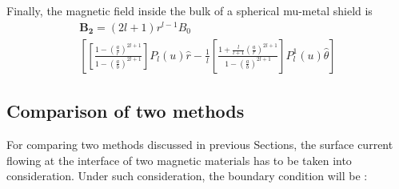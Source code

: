 


Finally, the magnetic field inside the bulk of a spherical mu-metal shield is
\begin{multline}\label{B}
\bm{B_2}=(2l+1)r^{l-1} B_0  \\
\left[ \left[\frac{1-\left(\frac{a}{r}\right)^{2l+1}}{1-\left(\frac{a}{b}\right)^{2l+1}}\right]P_l(u) \hat{r} -\frac{1}{l}\left[\frac{1+\frac{l}{l+1}\left(\frac{a}{r}\right)^{2l+1}}{1-\left(\frac{a}{b}\right)^{2l+1}}\right] P_l^1(u)\hat{\theta} \right]
\end{multline}


\subsection{Comparison of two methods}
For comparing two methods discussed in previous Sections, the surface current flowing at the interface of two magnetic materials has to be taken into consideration. Under such consideration, the boundary condition will be :


